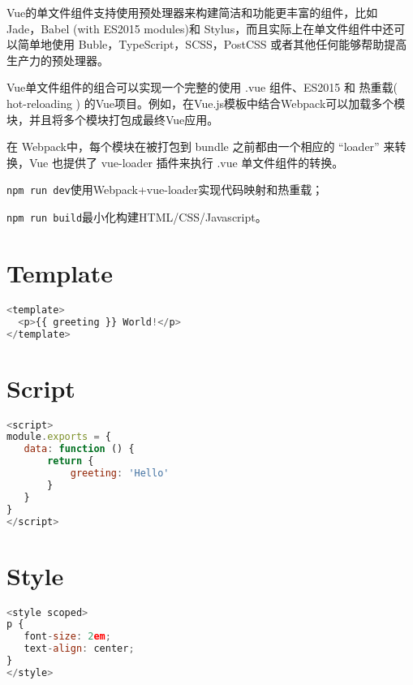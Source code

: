 Vue的单文件组件支持使用预处理器来构建简洁和功能更丰富的组件，比如 Jade，Babel (with ES2015 modules)和 Stylus，而且实际上在单文件组件中还可以简单地使用 Buble，TypeScript，SCSS，PostCSS 或者其他任何能够帮助提高生产力的预处理器。

Vue单文件组件的组合可以实现一个完整的使用 .vue 组件、ES2015 和 热重载( hot-reloading ) 的Vue项目。例如，在Vue.js模板中结合Webpack可以加载多个模块，并且将多个模块打包成最终Vue应用。



在 Webpack中，每个模块在被打包到 bundle 之前都由一个相应的 “loader” 来转换，Vue 也提供了 vue-loader 插件来执行 .vue 单文件组件的转换。

\begin{compactitem}
\item \texttt{npm run dev}使用Webpack+vue-loader实现代码映射和热重载；
\item \texttt{npm run build}最小化构建HTML/CSS/Javascript。
\end{compactitem}



\section{Template}



\begin{lstlisting}[language=JavaScript]
<template>
  <p>{{ greeting }} World!</p>
</template>
\end{lstlisting}


\section{Script}


\begin{lstlisting}[language=JavaScript]
<script>
module.exports = {
   data: function () {
       return {
           greeting: 'Hello'
       }
   }
}
</script>
\end{lstlisting}

\section{Style}



\begin{lstlisting}[language=JavaScript]
<style scoped>
p {
   font-size: 2em;
   text-align: center;
}
</style>
\end{lstlisting}


